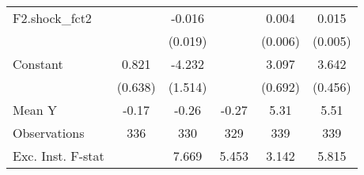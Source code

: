 {\begin{tabular}{l*{5}{c}}
\addlinespace
F2.shock\_fct2       &                     &      -0.016         &                     &       0.004         &       0.015\sym{***}\\
                    &                     &     (0.019)         &                     &     (0.006)         &     (0.005)         \\
\addlinespace
Constant            &       0.821         &      -4.232\sym{***}&                     &       3.097\sym{***}&       3.642\sym{***}\\
                    &     (0.638)         &     (1.514)         &                     &     (0.692)         &     (0.456)         \\
\midrule
Mean Y              &       -0.17         &       -0.26         &       -0.27         &        5.31         &        5.51         \\
Observations        &         336         &         330         &         329         &         339         &         339         \\
Exc. Inst. F-stat   &                     &       7.669         &       5.453         &       3.142         &       5.815         \\
\bottomrule
\end{tabular}
}
